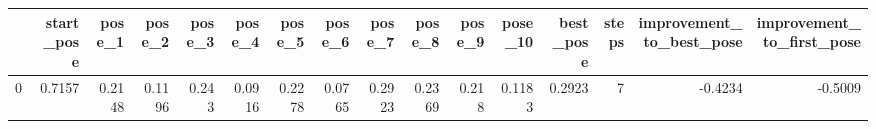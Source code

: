 \begin{tabular}{lrrrrrrrrrrrrrrr}
\toprule
{} &  start\_pose &  pose\_1 &  pose\_2 &  pose\_3 &  pose\_4 &  pose\_5 &  pose\_6 &  pose\_7 &  pose\_8 &  pose\_9 &  pose\_10 &  best\_pose &  steps &  improvement\_to\_best\_pose &  improvement\_to\_first\_pose \\
\midrule
0 &      0.7157 &  0.2148 &  0.1196 &   0.243 &  0.0916 &  0.2278 &  0.0765 &  0.2923 &  0.2369 &   0.218 &   0.1183 &     0.2923 &      7 &                   -0.4234 &                    -0.5009 \\
\bottomrule
\end{tabular}
